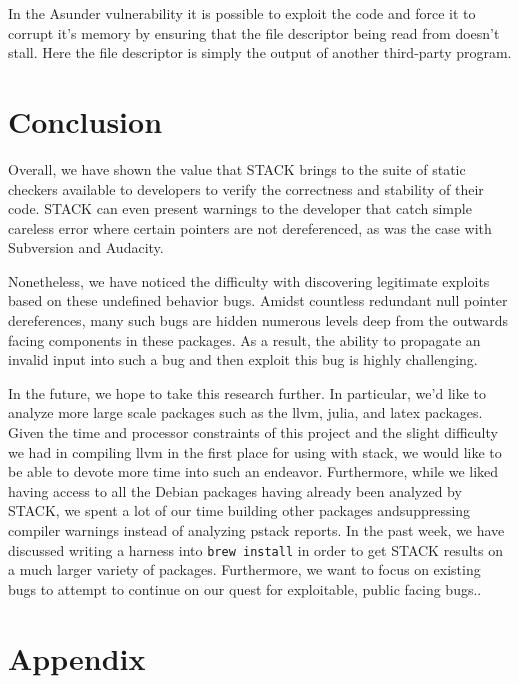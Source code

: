\documentclass[9pt,twocolumn]{article}
\begin{document}
In the Asunder vulnerability it is possible to exploit the code and force it to
corrupt it's memory by ensuring that the file descriptor being read from
doesn't stall. Here the file descriptor is simply the output of another
third-party program.

\section{Conclusion}
\label{sec:conclusion}
Overall, we have shown the value that STACK brings to the suite of static
checkers available to developers to verify the correctness and stability of
their code. STACK can even present warnings to the developer that catch simple
careless error where certain pointers are not dereferenced, as was the case
with Subversion and Audacity.

Nonetheless, we have noticed the difficulty with discovering legitimate
exploits based on these undefined behavior bugs. Amidst countless redundant
null pointer dereferences, many such bugs are hidden numerous levels deep from
the outwards facing components in these packages. As a result, the ability to
propagate an invalid input into such a bug and then exploit this bug is highly
challenging.

In the future, we hope to take this research further. In particular, we'd like
to analyze more large scale packages such as the llvm, julia, and latex
packages. Given the time and processor constraints of this project and the
slight difficulty we had in compiling llvm in the first place for using with
stack, we would like to be able to devote more time into such an endeavor.
Furthermore, while we liked having access to all the Debian packages having
already been analyzed by STACK, we spent a lot of our time building other
packages andsuppressing compiler warnings instead of analyzing pstack reports.
In the past week, we have discussed writing a harness into \texttt{brew
install} in order to get STACK results on a much larger variety of packages.
Furthermore, we want to focus on existing bugs to attempt to continue on our
quest for exploitable, public facing bugs..



\section{Appendix}
\label{sec:appendix}
\end{document}
